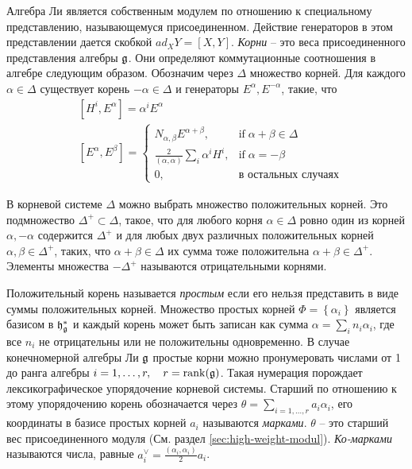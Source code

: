 Алгебра Ли является собственным модулем по отношению к специальному представлению, называющемуся присоединенном. Действие генераторов в этом представлении дается скобкой $ad_{X} Y=[X,Y]$. 
{\it Корни} -- это веса присоединенного представления алгебры $\mathfrak{g}$.  Они определяют коммутационные соотношения в алгебре следующим образом. Обозначим через $\Delta$ множество корней. Для каждого $\alpha\in \Delta$ существует корень  $-\alpha\in \Delta$ и генераторы $E^{\alpha}, E^{-\alpha}$, такие, что
\begin{align}
  \label{eq:63}
  &  [H^{i},E^{\alpha}]=\alpha^{i}E^{\alpha} \\
  &\left[E^{\alpha},E^{\beta}\right]=
  \begin{cases}
    N_{\alpha,\beta} E^{\alpha+\beta}, & \mbox{if}\; \alpha+\beta\in \Delta\\
    \frac{2}{(\alpha,\alpha)} \sum_{i}\alpha^{i} H^{i},&  \mbox{if}\; \alpha=-\beta\\
    0,&\mbox{в остальных случаях}
  \end{cases}
\end{align}

В корневой системе $\Delta$ можно выбрать множество положительных корней. Это подмножество  $\Delta^{+}\subset \Delta$, такое, что для любого корня $\alpha\in\Delta$ ровно один из корней $\alpha, -\alpha$ содержится $\Delta^{+}$ и для любых двух различных положительных корней $\alpha, \beta\in \Delta^{+}$, таких, что $\alpha+\beta\in \Delta$ их сумма тоже положительна $\alpha+\beta\in\Delta^{+}$.
Элементы множества $-\Delta^{+}$ называются отрицательными корнями.

Положительный корень называется {\it простым} если его нельзя представить в виде суммы положительных корней. Множество простых корней  $\Phi=\left\{\alpha_{i}\right\}$ является базисом в $\mathfrak{h}_{\mathfrak{g}}^{*}$ и каждый корень может быть записан как сумма $\alpha=\sum_{i}n_{i}\alpha_{i}$, где все $n_{i}$ не отрицательны или не положительны одновременно. В случае конечномерной алгебры Ли  $\mathfrak{g}$ простые корни можно пронумеровать числами от  1 до ранга алгебры $i=1,\dots,r,\quad r=\mathrm{rank}(\mathfrak{g})$. Такая нумерация порождает лексикографическое упорядочение корневой системы. Старший по отношению к этому упорядочению корень обозначается через $\theta=\sum_{i=1,\dots,r} a_i \alpha_i$, его координаты в базисе простых корней $a_i$ называются  {\it марками}. $\theta$ -- это старший вес присоединенного модуля (См. раздел \ref{sec:high-weight-modul}). {\it Ко-марками} называются числа, равные $a_i^{\vee}=\frac{(\alpha_i,\alpha_i)}{2} a_i$.

